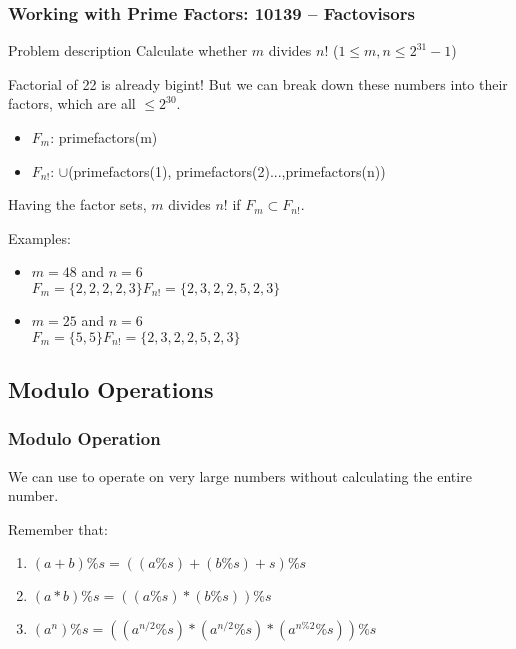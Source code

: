 \documentclass{beamer}
\begin{document}
\begin{frame}
  \frametitle{Working with Prime Factors: 10139 -- Factovisors}

  {\smaller
    \begin{block}{Problem description}
      Calculate whether $m$ divides $n!$ ($1 \leq m,n \leq 2^{31}-1$)
    \end{block}

    Factorial of 22 is already bigint! But we can break down these numbers into their
    factors, which are all $\leq 2^{30}$.

    \begin{itemize}
    \item $F_m$: primefactors(m)
    \item $F_{n!}$: $\cup$(primefactors(1), primefactors(2)...,primefactors(n))
    \end{itemize}

    Having the factor sets, $m$ divides $n!$ if $F_m \subset F_{n!}$.

    \bigskip

    Examples:
    \begin{itemize}
    \item $m = 48$ and $n=6$\\
      $F_m = \{2,2,2,2,3\} F_{n!} = \{2,3,2,2,5,2,3\}$

  \medskip

    \item $m = 25$ and $n = 6$\\
      $F_m = \{5,5\} F_{n!} = \{2,3,2,2,5,2,3\}$

    \end{itemize}
  }
\end{frame}

\subsection{Modulo Operations}
\begin{frame}
  \frametitle{Modulo Operation}

  {\smaller
  We can use  to operate on very large
  numbers without calculating the entire number.

  \bigskip

  Remember that:
  \begin{enumerate}
  \item $(a+b)\%s = ((a\%s)+(b\%s)+s)\%s$
  \item $(a*b)\%s = ((a\%s)*(b\%s))\%s$
  \item $(a^n)\%s = ((a^{n/2}\%s)*(a^{n/2}\%s)*(a^{n\%2}\%s))\%s$
  \end{enumerate}

  }
\end{frame}
\end{document}
